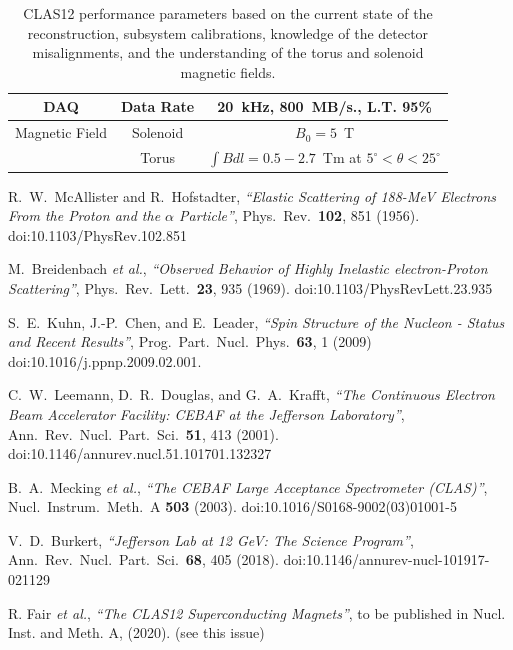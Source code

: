 \documentclass[final,3p]{elsarticle}
\begin{document}
\begin{twocolumn}
\begin{table}[t!]
\begin{center}
\begin{tabular}{c|c|c}
DAQ &  Data Rate &  20~kHz,  800~MB/s., L.T. 95\%  \\ \hline 
Magnetic Field & Solenoid & $B_0 = 5$~T\\ \cline{2-3}
& Torus & $\int \!\!Bdl = 0.5-2.7$~Tm at $5^\circ < \theta < 25^\circ$\\ \hline 
\end{tabular}
\caption{CLAS12 performance parameters based on the current state of the reconstruction, subsystem calibrations,
  knowledge of the detector misalignments, and the understanding of the torus and solenoid magnetic fields.}    
\label{clas12-performance}
\end{center}
\end{table}

\clearpage

\vfil
\eject

\begin{thebibliography}{99}

  R.~W.~McAllister and R.~Hofstadter,
  {\it ``Elastic Scattering of 188-{\rm MeV} Electrons From the Proton and the $\alpha$ Particle''}, 
  Phys.\ Rev.\  {\bf 102}, 851 (1956).
  doi:10.1103/PhysRev.102.851

  M.~Breidenbach {\it et al.},
  {\it ``Observed Behavior of Highly Inelastic electron-Proton Scattering''},
  Phys.\ Rev.\ Lett.\  {\bf 23}, 935 (1969).
  doi:10.1103/PhysRevLett.23.935
  
  S.~E.~Kuhn, J.-P.~Chen, and E.~Leader,
  {\it ``Spin Structure of the Nucleon - Status and Recent Results''},
  Prog.\ Part.\ Nucl.\ Phys.\  {\bf 63}, 1 (2009)
  doi:10.1016/j.ppnp.2009.02.001.
 
  C.~W.~Leemann, D.~R.~Douglas, and G.~A.~Krafft,
  {\it ``The Continuous Electron Beam Accelerator Facility: CEBAF at the Jefferson Laboratory''},
  Ann.\ Rev.\ Nucl.\ Part.\ Sci.\  {\bf 51}, 413 (2001).
  doi:10.1146/annurev.nucl.51.101701.132327

  B.~A.~Mecking {\it et al.},
  {\it ``The CEBAF Large Acceptance Spectrometer (CLAS)''},
  Nucl.\ Instrum.\ Meth.\ A {\bf 503} (2003).
  doi:10.1016/S0168-9002(03)01001-5

  V.~D.~Burkert,
  {\it ``Jefferson Lab at 12 GeV: The Science Program''}, 
  Ann.\ Rev.\ Nucl.\ Part.\ Sci.\  {\bf 68}, 405 (2018).
  doi:10.1146/annurev-nucl-101917-021129 
  
R. Fair {\it et al.}, {\it ``The CLAS12 Superconducting Magnets''}, to be published in Nucl. Inst.
and Meth. A, (2020). (see this issue)


\end{thebibliography}
\end{twocolumn}
\end{document}
